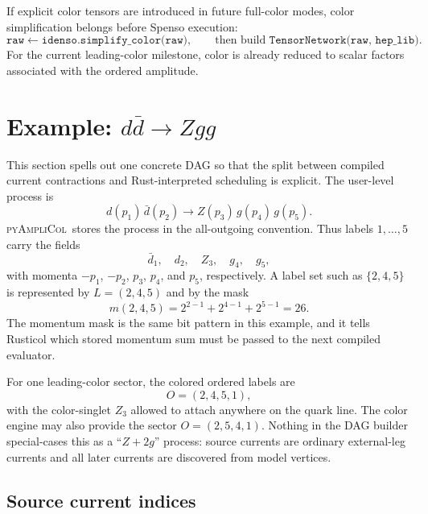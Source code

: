 \documentclass[10pt]{article}
\newcommand{\PAC}{\textsc{pyAmpliCol}}
\begin{document}
If explicit color tensors are introduced in future full-color modes, color
simplification belongs before Spenso execution:
\[
  \texttt{raw} \leftarrow \texttt{idenso.simplify\_color(raw)} ,
  \qquad
  \text{then build } \texttt{TensorNetwork(raw, hep\_lib)}.
\]
For the current leading-color milestone, color is already reduced to scalar
factors associated with the ordered amplitude.

\section{Example: \texorpdfstring{$d\bar d\to Zgg$}{d dbar -> Z g g}}

This section spells out one concrete DAG so that the split between compiled
current contractions and Rust-interpreted scheduling is explicit.  The
user-level process is
\[
  d(p_1)\,\bar d(p_2)\to Z(p_3)\,g(p_4)\,g(p_5).
\]
\PAC\ stores the process in the all-outgoing convention.  Thus labels
$1,\ldots,5$ carry the fields
\[
  \bar d_1,\quad d_2,\quad Z_3,\quad g_4,\quad g_5,
\]
with momenta $-p_1$, $-p_2$, $p_3$, $p_4$, and $p_5$, respectively.  A
label set such as $\{2,4,5\}$ is represented by
$L=(2,4,5)$ and by the mask
\[
  m(2,4,5)=2^{2-1}+2^{4-1}+2^{5-1}=26.
\]
The momentum mask is the same bit pattern in this example, and it tells
Rusticol which stored momentum sum must be passed to the next compiled
evaluator.

For one leading-color sector, the colored ordered labels are
\[
  O=(2,4,5,1),
\]
with the color-singlet $Z_3$ allowed to attach anywhere on the quark line.
The color engine may also provide the sector $O=(2,5,4,1)$.  Nothing in the
DAG builder special-cases this as a ``$Z+2g$'' process: source currents are
ordinary external-leg currents and all later currents are discovered from
model vertices.

\subsection*{Source current indices}
\end{document}
